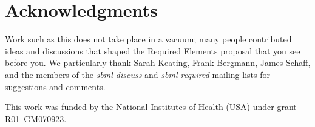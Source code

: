 
\section{Acknowledgments}

Work such as this does not take place in a vacuum; many people contributed ideas and discussions that shaped the Required Elements proposal that you see before you.  We particularly thank Sarah Keating, Frank Bergmann, James Schaff, and the members of the \emph{sbml-discuss} and \emph{sbml-required} mailing lists for suggestions and comments.

This work was funded by the National Institutes of Health (USA) under grant R01~GM070923.
